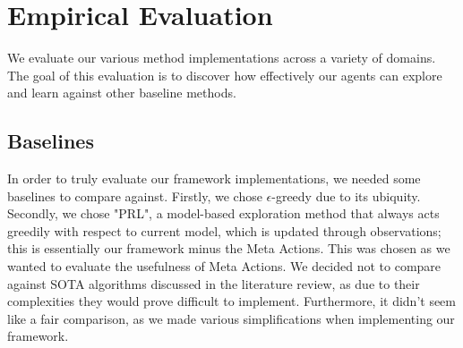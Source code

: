 \chapter{Empirical Evaluation}
\label{chapter4}
We evaluate our various method implementations across a variety of domains. The goal of this evaluation is to discover how effectively our agents can explore and learn against other baseline methods. 
\section{Baselines}
In order to truly evaluate our framework implementations, we needed some baselines to compare against. Firstly, we chose $\epsilon$-greedy due to its ubiquity. Secondly, we chose "PRL", a model-based exploration method that always acts greedily with respect to current model, which is updated through observations; this is essentially our framework minus the Meta Actions. This was chosen as we wanted to evaluate the usefulness of Meta Actions. We decided not to compare against SOTA algorithms discussed in the literature review, as due to their complexities they would prove difficult to implement. Furthermore, it didn't seem like a fair comparison, as we made various simplifications when implementing our framework.
